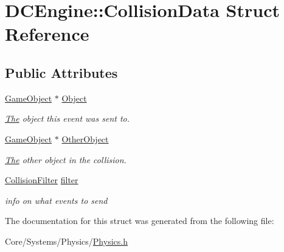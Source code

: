 \hypertarget{structDCEngine_1_1CollisionData}{\section{D\-C\-Engine\-:\-:Collision\-Data Struct Reference}
\label{structDCEngine_1_1CollisionData}
}
\subsection*{Public Attributes}
\begin{DoxyCompactItemize}
\item 
\hypertarget{structDCEngine_1_1CollisionData_a4c363e91902e439d3973349fc9f9956d}{\hyperlink{classDCEngine_1_1GameObject}{Game\-Object} $\ast$ \hyperlink{structDCEngine_1_1CollisionData_a4c363e91902e439d3973349fc9f9956d}{Object}}\label{structDCEngine_1_1CollisionData_a4c363e91902e439d3973349fc9f9956d}

\begin{DoxyCompactList}\small\item\em \hyperlink{classThe}{The} object this event was sent to. \end{DoxyCompactList}\item 
\hypertarget{structDCEngine_1_1CollisionData_a34516d1aa75eebbc7600705b7eef7ab1}{\hyperlink{classDCEngine_1_1GameObject}{Game\-Object} $\ast$ \hyperlink{structDCEngine_1_1CollisionData_a34516d1aa75eebbc7600705b7eef7ab1}{Other\-Object}}\label{structDCEngine_1_1CollisionData_a34516d1aa75eebbc7600705b7eef7ab1}

\begin{DoxyCompactList}\small\item\em \hyperlink{classThe}{The} other object in the collision. \end{DoxyCompactList}\item 
\hypertarget{structDCEngine_1_1CollisionData_a86252b2c37bba3acd2f649a9d0e88762}{\hyperlink{structDCEngine_1_1CollisionFilter}{Collision\-Filter} \hyperlink{structDCEngine_1_1CollisionData_a86252b2c37bba3acd2f649a9d0e88762}{filter}}\label{structDCEngine_1_1CollisionData_a86252b2c37bba3acd2f649a9d0e88762}

\begin{DoxyCompactList}\small\item\em info on what events to send \end{DoxyCompactList}\end{DoxyCompactItemize}


The documentation for this struct was generated from the following file\-:\begin{DoxyCompactItemize}
\item 
Core/\-Systems/\-Physics/\hyperlink{Physics_8h}{Physics.\-h}\end{DoxyCompactItemize}
